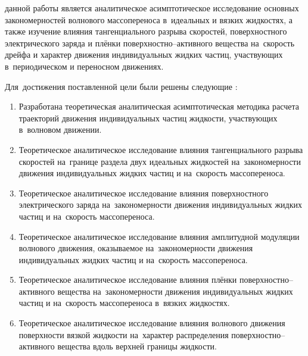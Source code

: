{\aim} данной работы является аналитическое асимптотическое исследование основных закономерностей волнового массопереноса в~идеальных и вязких жидкостях, а также изучение влияния тангенциального разрыва скоростей, поверхностного электрического заряда и плёнки поверхностно--активного вещества на~скорость дрейфа и характер движения индивидуальных жидких частиц, участвующих в~периодическом и переносном движениях.

Для~достижения поставленной цели были решены следующие {\tasks}:
\begin{enumerate}
  \item Разработана теоретическая аналитическая асимптотическая методика расчета траекторий движения индивидуальных частиц жидкости, участвующих в~волновом движении.
  \item Теоретическое аналитическое исследование влияния тангенциального разрыва скоростей на~границе раздела двух идеальных жидкостей на~закономерности движения индивидуальных жидких частиц и на~скорость массопереноса.
  \item Теоретическое аналитическое исследование влияния поверхностного электрического заряда на~закономерности движения индивидуальных жидких частиц и на~скорость массопереноса.
  \item Теоретическое аналитическое исследование влияния амплитудной модуляции волнового движения, оказываемое на~закономерности движения индивидуальных жидких частиц и на~скорость массопереноса.
  \item Теоретическое аналитическое исследование влияния плёнки поверхностно--активного вещества на~закономерности движения индивидуальных жидких частиц и на~скорость массопереноса в~вязких жидкостях.
  \item Теоретическое аналитическое исследование влияния волнового движения поверхности вязкой жидкости на~характер распределения поверхностно--активного вещества вдоль верхней границы жидкости.
\end{enumerate}


